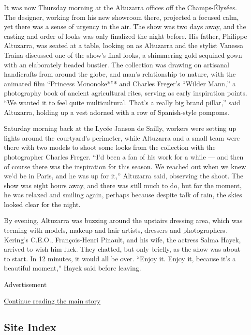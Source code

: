 It was now Thursday morning at the Altuzarra offices off the
Champs-Élysées. The designer, working from his new showroom there,
projected a focused calm, yet there was a sense of urgency in the air.
The show was two days away, and the casting and order of looks was only
finalized the night before. His father, Philippe Altuzarra, was seated
at a table, looking on as Altuzarra and the stylist Vanessa Traina
discussed one of the show's final looks, a shimmering gold-sequined gown
with an elaborately beaded bustier. The collection was drawing on
artisanal handicrafts from around the globe, and man's relationship to
nature, with the animated film ``Princess Mononoke*''* and Charles
Freger's ``Wilder Mann,'' a photography book of ancient agricultural
rites, serving as early inspiration points. ``We wanted it to feel quite
multicultural. That's a really big brand pillar,'' said Altuzarra,
holding up a vest adorned with a row of Spanish-style pompoms.

Saturday morning back at the Lycée Janson de Sailly, workers were
setting up lights around the courtyard's perimeter, while Altuzarra and
a small team were there with two models to shoot some looks from the
collection with the photographer Charles Freger. ``I'd been a fan of his
work for a while --- and then of course there was the inspiration for
this season. We reached out when we knew we'd be in Paris, and he was up
for it,'' Altuzarra said, observing the shoot. The show was eight hours
away, and there was still much to do, but for the moment, he was relaxed
and smiling again, perhaps because despite talk of rain, the skies
looked clear for the night.

By evening, Altuzarra was buzzing around the upstairs dressing area,
which was teeming with models, makeup and hair artists, dressers and
photographers. Kering's C.E.O., François-Henri Pinault, and his wife,
the actress Salma Hayek, arrived to wish him luck. They chatted, but
only briefly, as the show was about to start. In 12 minutes, it would
all be over. ``Enjoy it. Enjoy it, because it's a beautiful moment,''
Hayek said before leaving.

Advertisement

\protect\hyperlink{after-bottom}{Continue reading the main story}

\hypertarget{site-index}{%
\subsection{Site Index}\label{site-index}}

